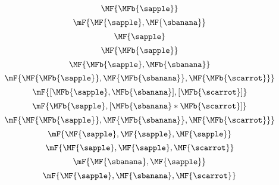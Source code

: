 {\begin{forslides}
\begin{equation}
        \label{eq:fruit-sum-5}
        \MF{\MFb{\sapple}}
    \end{equation}
    \begin{equation}
        \label{eq:fruit-sum-6}
        \mF {\MF{\sapple}  ,  \MF{\sbanana}}
    \end{equation}
    \begin{equation}
        \label{eq:fruit-sum-6a}
        \MF{\sapple}
    \end{equation}
    \begin{equation}
        \label{eq:fruit-sum-6b}
        \MF{\MFb{\sapple}}
    \end{equation}
    \begin{equation}
        \label{eq:fruit-sum-6-bis}
        \MF{\MFb{\sapple}  , \MFb{\sbanana}}
    \end{equation}
    \begin{equation}
        \label{eq:fruit-sum-7}
        \mF {\MF{\MFb{\sapple}} , \MF{\MFb{\sbanana}}  , \MF{\MFb{\scarrot}}}
    \end{equation}
    \begin{equation}
        \label{eq:fruit-sum-7-bis}
        \mF{[\MFb{\sapple}  , \MFb{\sbanana}] ,  [\MFb{\scarrot}]}
    \end{equation}
    \begin{equation}
        \label{eq:fruit-sum-8}
        \mF{\MFb{\sapple}   , [\MFb{\sbanana}  * \MFb{\scarrot}]}
    \end{equation}
    \begin{equation}
        \label{eq:fruit-sum-9}
        \mF{\MF{\MFb{\sapple}}  , \MF{\MFb{\sbanana}} ,  \MF{\MFb{\scarrot}}}
    \end{equation}
    \begin{equation}
        \label{eq:fruit-sum-10}
        \mF{\MF{\sapple}   ,  \MF{\sapple}  ,  \MF{\sapple}}
    \end{equation}
    \begin{equation}
        \label{eq:fruit-sum-11}
        \mF{\MF{\sapple}   , \MF{\sapple}  ,\MF{\scarrot}}
    \end{equation}
    \begin{equation}
        \label{eq:fruit-sum-12}
        \mF{\MF{\sbanana} , \MF{\sapple}}
    \end{equation}
    \begin{equation}
        \label{eq:fruit-sum-13}
        \mF{\MF{\sapple}   ,  \MF{\sbanana}  ,  \MF{\scarrot}}
    \end{equation}

\end{forslides}}
